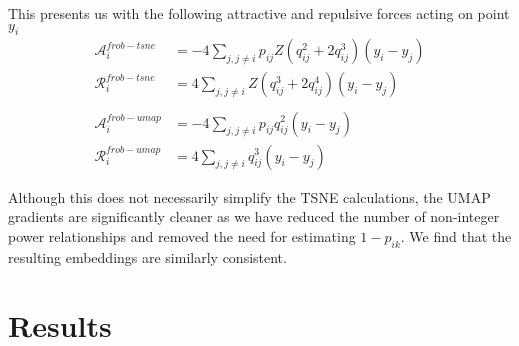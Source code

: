 \documentclass[sigconf, nonacm]{acmart}
\begin{document}
This presents us with the following attractive and repulsive forces acting on point $y_i$
\begin{align*}
    \mathcal{A}_i^{frob-tsne} &= -4 \sum_{j, j \neq i} p_{ij} Z (q_{ij}^2 + 2q_{ij}^3) (y_i - y_j) \\
    \mathcal{R}_i^{frob-tsne} &= 4 \sum_{j, j \neq i} Z( q_{ij}^3 + 2q_{ij}^4) (y_i - y_j) \\
    &\\
    \mathcal{A}_i^{frob-umap} &= -4 \sum_{j, j \neq i} p_{ij} q_{ij}^2 (y_i - y_j) \\
    \mathcal{R}_i^{frob-umap} &= 4 \sum_{j, j \neq i} q_{ij}^3 (y_i - y_j)  
\end{align*}

Although this does not necessarily simplify the TSNE calculations, the UMAP gradients are significantly cleaner as we have reduced the number of non-integer
power relationships and removed the need for estimating $1 - p_{ik}$. We find that the resulting embeddings are similarly consistent.

\section{Results}
\end{document}
